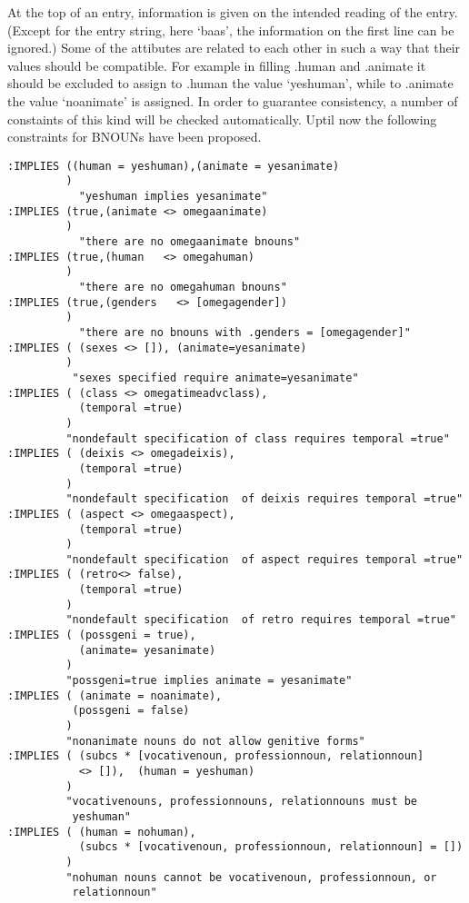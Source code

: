 At the top of an entry,
information is given on the intended reading of the entry.
(Except for the entry string, here `baas', the information on the first line 
can be ignored.) Some of 
the attibutes are related to each other in such a way that their
values should be compatible. For example in filling
.human and .animate it should be excluded to assign to .human the value 
`yeshuman', while to .animate 
the value `noanimate' is assigned. 
In order to guarantee consistency, 
a number of constaints of this kind will be checked 
automatically.
Uptil now the following constraints for BNOUNs have been proposed.

\begin{verbatim}
:IMPLIES ((human = yeshuman),(animate = yesanimate)
         ) 
           "yeshuman implies yesanimate"
:IMPLIES (true,(animate <> omegaanimate)
         )           
           "there are no omegaanimate bnouns"
:IMPLIES (true,(human   <> omegahuman)
         )              
           "there are no omegahuman bnouns"
:IMPLIES (true,(genders   <> [omegagender])
         )              
           "there are no bnouns with .genders = [omegagender]"
:IMPLIES ( (sexes <> []), (animate=yesanimate)
         )
          "sexes specified require animate=yesanimate"
:IMPLIES ( (class <> omegatimeadvclass),
           (temporal =true)
         )
         "nondefault specification of class requires temporal =true"
:IMPLIES ( (deixis <> omegadeixis),
           (temporal =true)
         )
         "nondefault specification  of deixis requires temporal =true"
:IMPLIES ( (aspect <> omegaaspect),
           (temporal =true)
         )
         "nondefault specification  of aspect requires temporal =true"
:IMPLIES ( (retro<> false),
           (temporal =true)
         )
         "nondefault specification  of retro requires temporal =true"
:IMPLIES ( (possgeni = true),
           (animate= yesanimate)
         )
         "possgeni=true implies animate = yesanimate"
:IMPLIES ( (animate = noanimate),
          (possgeni = false)
         )
         "nonanimate nouns do not allow genitive forms"
:IMPLIES ( (subcs * [vocativenoun, professionnoun, relationnoun] 
           <> []),  (human = yeshuman)
         )
         "vocativenouns, professionnouns, relationnouns must be 
          yeshuman"
:IMPLIES ( (human = nohuman),
           (subcs * [vocativenoun, professionnoun, relationnoun] = [])
         )
         "nohuman nouns cannot be vocativenoun, professionnoun, or 
          relationnoun"

\end{verbatim}

